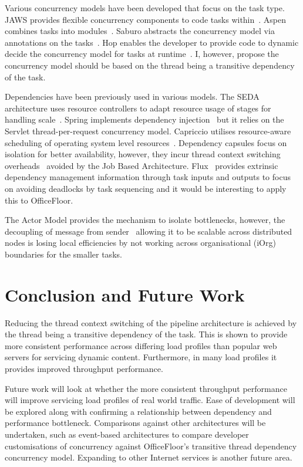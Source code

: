 \documentclass[conference]{ieee/IEEEtran}
\begin{document}
Various concurrency models have been developed that focus on the task type.
JAWS provides flexible concurrency components to code tasks within~\cite{jaws}.
Aspen combines tasks into modules~\cite{aspen}.  Saburo abstracts the
concurrency model via annotations on the tasks~\cite{saburo}.  Hop enables the
developer to provide code to dynamic decide the concurrency model for tasks at
runtime~\cite{hop}.  I, however, propose the concurrency model should be based
on the thread being a transitive dependency of the task.

Dependencies have been previously used in various models.  The SEDA architecture
uses resource controllers to adapt resource usage of stages for handling
scale~\cite{seda}.  Spring implements dependency injection~\cite{ioc} but it
relies on the Servlet thread-per-request concurrency model.  Capriccio utilises
resource-aware scheduling of operating system level resources~\cite{capriccio}.
Dependency capsules focus on isolation for better availability, however, they
incur thread context switching overheads~\cite{dependency-capsules} avoided by
the Job Based Architecture.  Flux~\cite{flux} provides extrinsic dependency
management information through task inputs and outputs to focus on avoiding
deadlocks by task sequencing and it would be interesting to apply this to
OfficeFloor.

The Actor Model provides the mechanism to isolate bottlenecks, however, the
decoupling of message from sender~\cite{actors} allowing it to be scalable
across distributed nodes is losing local efficiencies by not working across
organisational (iOrg) boundaries for the smaller tasks.


\section{Conclusion and Future Work}
Reducing the thread context switching of the pipeline architecture is achieved
by the thread being a transitive dependency of the task.  This is shown to
provide more consistent performance across differing load profiles than popular
web servers for servicing dynamic content.  Furthermore, in many load profiles
it provides improved throughput performance.

Future work will look at whether the more consistent throughput performance will
improve servicing load profiles of real world traffic.  Ease of development will
be explored along with confirming a relationship between dependency and
performance bottleneck.  Comparisons against other architectures will be
undertaken, such as event-based architectures to compare developer
customisations of concurrency against OfficeFloor's transitive thread dependency
concurrency model.  Expanding to other Internet services is another future area.
\end{document}
